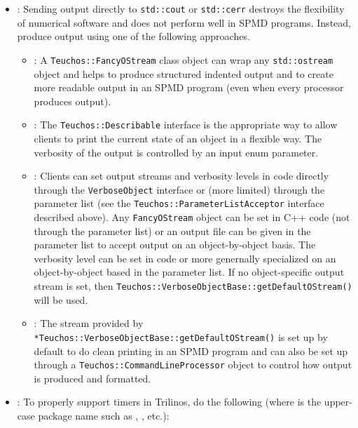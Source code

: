 \begin{itemize}
\item\GCGStdStream: Sending output directly to \texttt{std\-::cout} or
  \texttt{std\-::cerr} destroys the flexibility of numerical software
  and does not perform well in SPMD programs.  Instead, produce output
  using one of the following approaches.

  \begin{itemize}
  \item\GCGTeuchosFancyOStream: A \texttt{Teuchos\-::Fancy\-OStream}
    class object can wrap any \texttt{std\-::ostream} object and helps
    to produce structured indented output and to create more readable
    output in an SPMD program (even when every processor produces
    output).
  
  \item\GCGTeuchosDescribable: The \texttt{Teuchos\-::Describable}
    interface is the appropriate way to allow clients to print the
    current state of an object in a flexible way.  The verbosity of
    the output is controlled by an input enum parameter.
  
  \item\GCGTeuchosVerboseObject: Clients can set output streams and
    verbosity levels in code directly through the
    {}\texttt{VerboseObject} interface or (more limited) through the
    parameter list (see the {}\texttt{Teuchos\-::ParameterListAcceptor}
    interface described above).  Any {}\texttt{FancyOStream} object can
    be set in C++ code (not through the parameter list) or an output
    file can be given in the parameter list to accept output on an
    object-by-object basis.  The verbosity level can be set in code or
    more genernally specialized on an object-by-object based in the
    parameter list.  If no object-specific output stream is set, then
    {}\texttt{Teuchos\-::Verbose\-Object\-Base\-::get\-Default\-OStream()}
    will be used.
  
  \item\GCGTeuchosVerboseObjectBaseDefaultOStream: The stream provided
    by
    \texttt{*Teuchos\-::Verbose\-Object\-Base\-::get\-Default\-OStream()}
    is set up by default to do clean printing in an SPMD program and
    can also be set up through a
    \texttt{Teuchos\-::Command\-Line\-Processor} object to control how
    output is produced and formatted.

  \end{itemize}

{}\item\GCGTeuchosTimers: To properly support timers in Trilinos, do
the following (where {} is the upper-case package
name such as {}, {}, etc.):


\end{itemize}
